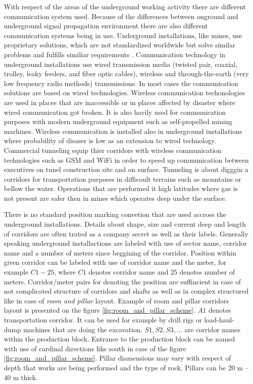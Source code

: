 \documentclass[../main.tex]{subfiles}
\begin{document}
With respect of the areas of the underground working activity there are different communication system used. Because of the differences between onground and underground signal propagation environment there are also different communication systems being in use. Underground installations, like mines, use proprietary solutions, which are not standardized worldwide but solve similar problems and fulfills similiar requirements \cite{article-wireless-undeground-critics}\cite{article_mine_communications_safety}. Communication technology in underground installations use wired transmission media (twisted pair, coaxial, trolley, leaky feeders, and fiber optic cables), wireless and through-the-earth (very low frequency radio methods) transmissions. In most cases the communication solutions are based on wired technologies. Wireless communication techonologies are used in places that are inaccessible or in places affected by disaster where wired communication got broken. It is also havily used for communication purposes with modern underground equipment such as self-propelled mining machines. Wireless communication is installed also in underground installations where probability of disaser is low as an extension to wired technology. Commercial tunneling equip thier corridors with wireless communication technologies such as GSM and WiFi in order to speed up communication between executives on tunel construction site and on surface. Tunneling is about digggin a corridors for transportation purposes in difficoult terrains such as mountains or bellow the water. Operations that are performed it high latitudes where gas is not present are safer then in mines which operates deep under the surface.

There is no standard position marking convetion that are used accross the underground installations. Details about shape, size and current deep and length of corridors are often trated as a company secret as well as their labels. Generally speaking underground installactions are labeled with use of sector name, corridor name and a number of meters since beggining of the corridor. Position within given corridor can be labeled with use of corridor name and the meter, for example $C1-25$, where $C1$ denotes corridor name and $25$ denotes number of meters. Corridor/meter pairs for denoting the position are suffincient in case of not complicated structure of corridors and shafts as well as in complex structured like in case of \textit{room and pillar} layout. Example of room and pillar corridors layout is presented on the figure \ref{fig:room_and_pillar_scheme}. $A1$ denotes transportation corridor. It can be used for example by drill rigs or load-haul-dump machines that are doing the excavation. $S1, S2, S3, ...$ are corridor names within the production block. Entrance to the production block can be named with use of cardinal directions like south in case of the figure \ref{fig:room_and_pillar_scheme}. Pillar diamensions may vary with respect of depth that works are being performed and the type of rock. Pillars can be 20 m -- 40 m thick.
\end{document}
